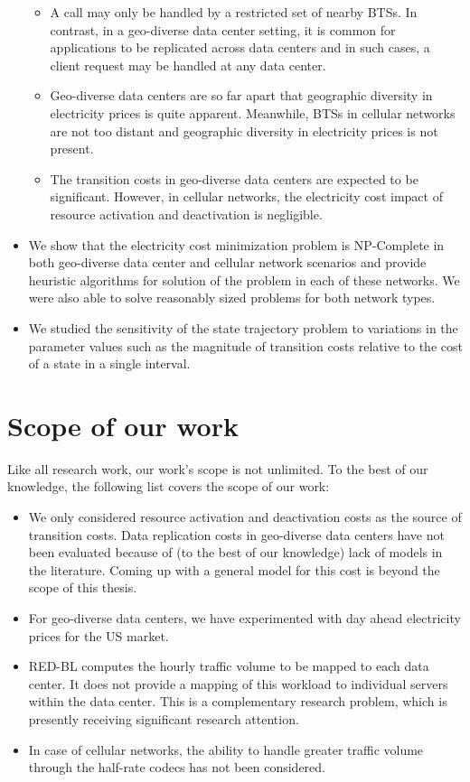 \begin{itemize}
\begin{itemize}
	\item A call may only be handled by a restricted set of nearby BTSs. In contrast, in a geo-diverse data center setting, it is common for applications to be replicated across data centers and in such cases, a client request may be handled at any data center.
	\item Geo-diverse data centers are so far apart that geographic diversity in electricity prices is quite apparent. Meanwhile, BTSs in cellular networks are not too distant and geographic diversity in electricity prices is not present.
	\item The transition costs in geo-diverse data centers are expected to be significant. However, in cellular networks, the electricity cost impact of resource activation and deactivation is negligible.
	\end{itemize}
\item We show that the electricity cost minimization problem is NP-Complete in both geo-diverse data center and cellular network scenarios and provide heuristic algorithms for solution of the problem in each of these networks. We were also able to solve reasonably sized problems for both network types.
\item We studied the sensitivity of the state trajectory problem to variations in the parameter values such as the magnitude of transition costs relative to the cost of a state in a single interval.
\end{itemize}

\section{Scope of our work} Like all research work, our work's scope is not unlimited. To the best of our knowledge, the following list covers the scope of our work:
\begin{itemize}
\item We only considered resource activation and deactivation costs as the source of transition costs. Data replication costs in geo-diverse data centers have not been evaluated because of (to the best of our knowledge) lack of models in the literature. Coming up with a general model for this cost is beyond the scope of this thesis.
\item For geo-diverse data centers, we have experimented with day ahead electricity prices for the US market. 
\item RED-BL computes the hourly traffic volume to be mapped to each data center. It does not provide a mapping of this workload to individual servers within the data center. This is a complementary research problem, which is presently receiving significant research attention.
\item In case of cellular networks, the ability to handle greater traffic volume through the half-rate codecs has not been considered.
\end{itemize}

